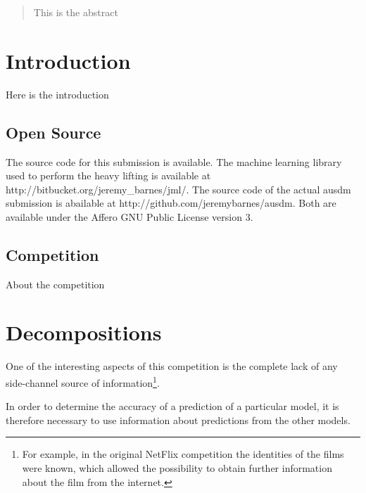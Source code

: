 \documentclass{article}
\begin{document}
 


\begin{abstract} 
This is the abstract
\end{abstract} 

\section{Introduction}

Here is the introduction

\subsection{Open Source}

The source code for this submission is available.  The machine learning library used to perform the heavy lifting is available at http://bitbucket.org/jeremy\_barnes/jml/.  The source code of the actual ausdm submission is abailable at http://github.com/jeremybarnes/ausdm.  Both are available under the Affero GNU Public License version 3.

\subsection{Competition}

About the competition

\section{Decompositions}

One of the interesting aspects of this competition is the complete lack of any
side-channel source of information\footnote{For example, in the original NetFlix
competition the identities of the films were known, which allowed the
possibility to obtain further information about the film from the internet.}.

In order to determine the accuracy of a prediction of a particular model, it is
therefore necessary to use information about predictions from the other models.
\end{document}

